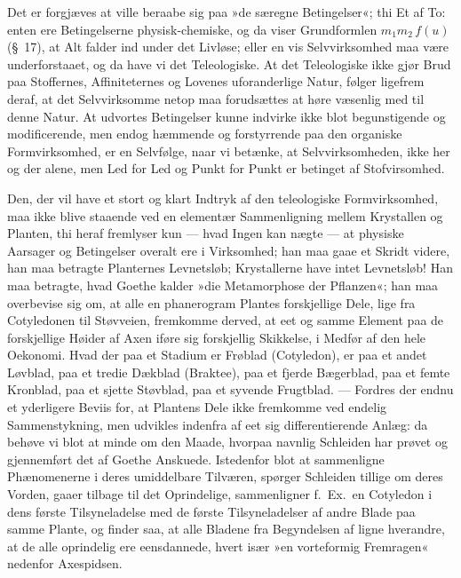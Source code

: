 \documentclass[12pt]{book}
\newcommand{\apage}[1]{\marginnote{\footnotesize\textit{[#1]}}}
\begin{document}
Det er forgjæves at ville beraabe sig paa »de særegne Betingelser«; thi Et
af To: enten ere Betingelserne physisk-chemiske, og da viser Grundformlen
$m_1 m_2\, f(u)$ (§\ 17), at Alt falder ind under det Livløse; eller en vis
Selvvirksomhed maa være underforstaaet, \apage{188} og da have vi det Teleologiske. At
det Teleologiske ikke gjør Brud paa Stoffernes, Affiniteternes og Lovenes
uforanderlige Natur, følger ligefrem deraf, at det Selvvirksomme netop maa
forudsættes at høre væsenlig med til denne Natur. At udvortes Betingelser
kunne indvirke ikke blot begunstigende og modificerende, men endog
hæmmende og forstyrrende paa den organiske Formvirksomhed, er en Selvfølge,
naar vi betænke, at Selvvirksomheden, ikke her og der alene, men Led for
Led og Punkt for Punkt er betinget af Stofvirsomhed.

Den, der vil have et stort og klart Indtryk af den teleologiske
Formvirksomhed, maa ikke blive staaende ved en elementær Sammenligning
mellem Krystallen og Planten, thi heraf fremlyser kun --- hvad Ingen kan nægte
--- at physiske Aarsager og Betingelser overalt ere i Virksomhed; han maa
gaae et Skridt videre, han maa betragte Planternes Levnetsløb; Krystallerne
have intet Levnetsløb! Han maa betragte, hvad Goethe kalder »die
Metamorphose der Pflanzen«; han maa overbevise sig om, at alle en
phanerogram Plantes forskjellige Dele, lige fra Cotyledonen til Støvveien,
fremkomme derved, at eet og samme Element paa de forskjellige Høider af
Axen iføre sig forskjellig Skikkelse, i Medfør af den hele Oekonomi. Hvad
der paa et Stadium er Frøblad (Cotyledon), er paa et andet Løvblad, paa et
tredie Dækblad (Braktee), paa et fjerde Bægerblad, paa et femte Kronblad,
paa et sjette Støvblad, paa et syvende Frugtblad. --- Fordres der endnu et
yderligere Beviis for, at Plantens Dele ikke fremkomme ved endelig
Sammenstykning, men udvikles \apage{189} indenfra af eet sig differentierende Anlæg: da
behøve vi blot at minde om den Maade, hvorpaa navnlig Schleiden har prøvet
og gjennemført det af Goethe Anskuede. Istedenfor blot at sammenligne
Phænomenerne i deres umiddelbare Tilværen, spørger Schleiden tillige om
deres Vorden, gaaer tilbage til det Oprindelige, sammenligner f.\ Ex.\ en
Cotyledon i dens første Tilsyneladelse med de første Tilsyneladelser af
andre Blade paa samme Plante, og finder saa, at alle Bladene fra
Begyndelsen af ligne hverandre, at de alle oprindelig ere eensdannede,
hvert især »en vorteformig Fremragen« nedenfor Axespidsen.
\end{document}

